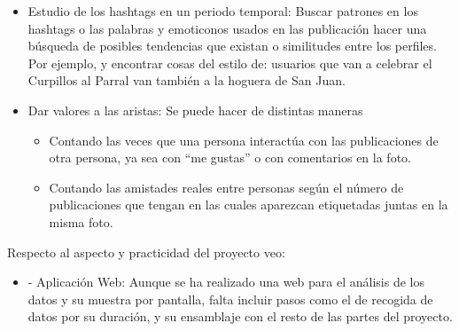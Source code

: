 \begin{itemize}
	\item Estudio de los hashtags en un periodo temporal: Buscar patrones en los hashtags o las palabras y emoticonos usados en las publicación hacer una búsqueda de posibles tendencias que existan o similitudes entre los perfiles. Por ejemplo, y encontrar cosas del estilo de: usuarios que van a celebrar el Curpillos al Parral van también a la hoguera de San Juan. 
	\item Dar valores a las aristas: Se puede hacer de distintas maneras
	\begin{itemize}
	    \item Contando las veces que una persona interactúa con las publicaciones de otra persona, ya sea con “me gustas” o con comentarios en la foto.
	    \item Contando las amistades reales entre personas según el número de publicaciones que tengan en las cuales aparezcan etiquetadas juntas en la misma foto.
    \end{itemize}
\end{itemize}
Respecto al aspecto y practicidad del proyecto veo:
\begin{itemize}
	    \item -	Aplicación Web: Aunque se ha realizado una web para el análisis de los datos y su muestra por pantalla, falta incluir pasos como el de recogida de datos por su duración, y su ensamblaje con el resto de las partes del proyecto.
    \end{itemize}